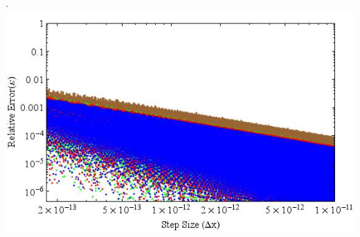 \documentclass{report}
\begin{document}
\begin{enumerate}
\\\\.\hspace{6 mm} \includegraphics[scale=.5]{fivePoint.jpeg}
\end{enumerate}
\end{document}
